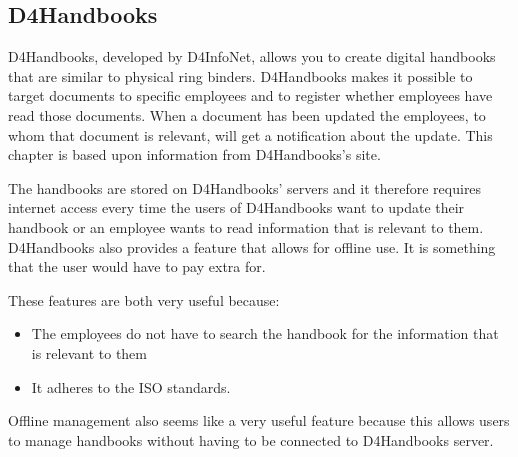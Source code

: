 \subsection{D4Handbooks}
D4Handbooks, developed by D4InfoNet, allows you to create digital handbooks that are similar to physical ring binders.
D4Handbooks makes it possible to target documents to specific employees and to register whether employees have read those documents.
When a document has been updated the employees, to whom that document is relevant, will get a notification about the update.
This chapter is based upon information from D4Handbooks's site\cite{D4Hanbook}.

The handbooks are stored on D4Handbooks' servers and it therefore requires internet access every time the users of D4Handbooks want to update their handbook or an employee wants to read information that is relevant to them.
D4Handbooks also provides a feature that allows for offline use. It is something that the user would have to pay extra for.

These features are both very useful because:

\begin{itemize}
        \item
        The employees do not have to search the handbook for the information that is relevant to them
        \item
        It adheres to the ISO standards.
\end{itemize}

Offline management also seems like a very useful feature because this allows users to manage handbooks without having to be connected to D4Handbooks server.
